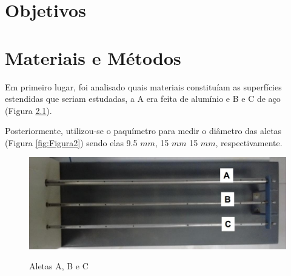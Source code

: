 \documentclass[12pt,openright,twoside,a4paper]{abntex2}
\begin{document}
\chapter{Objetivos}\label{ch: Objetivos}



\chapter{Materiais e Métodos}\label{ch: Materiais e Métodos}

Em primeiro lugar, foi analisado quais materiais constituíam as superfícies estendidas que seriam estudadas, a A era feita de alumínio e B e C de aço (Figura \ref{fig:Figura1}).

Posteriormente, utilizou-se o paquímetro para medir o diâmetro das aletas (Figura \ref{fig:Figura2}) sendo elas 9.5 $mm$, 15 $mm$ 15 $mm$, respectivamente.
\begin{figure}[H]
	\caption{Aletas A, B e C}
	\centering
	\includegraphics[scale=0.4]{figura1.jpg}
	\label{fig:Figura1}
\end{figure}
\end{document}
